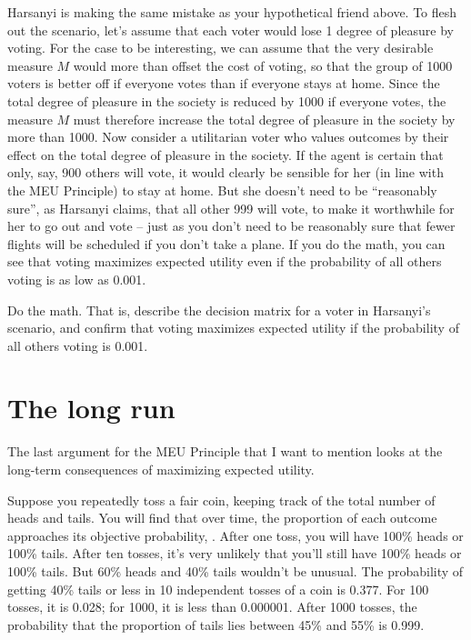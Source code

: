 Harsanyi is making the same mistake as your hypothetical friend above.
To flesh out the scenario, let's assume that each voter would lose 1
degree of pleasure by voting. For the case to be interesting, we can
assume that the very desirable measure $M$ would more than offset the
cost of voting, so that the group of 1000 voters is better off if
everyone votes than if everyone stays at home. Since the total degree
of pleasure in the society is reduced by 1000 if everyone votes, the
measure $M$ must therefore increase the total degree of pleasure in
the society by more than 1000. Now consider a utilitarian voter who
values outcomes by their effect on the total degree of pleasure in the
society. If the agent is certain that only, say, 900 others will vote,
it would clearly be sensible for her (in line with the MEU Principle)
to stay at home. But she doesn't need to be ``reasonably sure'', as
Harsanyi claims, that all other 999 will vote, to make it worthwhile
for her to go out and vote -- just as you don't need to be reasonably
sure that fewer flights will be scheduled if you don't take a plane.
If you do the math, you can see that voting maximizes expected utility
even if the probability of all others voting is as low as 0.001.

\begin{exercise3}
  Do the math. That is, describe the decision matrix for a voter in
  Harsanyi's scenario, and confirm that voting maximizes expected
  utility if the probability of all others voting is
  0.001.
\end{exercise3}

\section{The long run}

The last argument for the MEU Principle that I want to mention looks
at the long-term consequences of maximizing expected utility.

Suppose you repeatedly toss a fair coin, keeping track of the total
number of heads and tails. You will find that over time, the
proportion of each outcome approaches its objective probability,
. After one toss, you will have 100\% heads or 100\%
tails. After ten tosses, it's very unlikely that you'll still have
100\% heads or 100\% tails. But 60\% heads and 40\% tails wouldn't be
unusual. The probability of getting 40\% tails or less in 10
independent tosses of a coin is 0.377. For 100 tosses, it is 0.028;
for 1000, it is less than 0.000001. After 1000 tosses, the probability
that the proportion of tails lies between 45\% and 55\% is 0.999.

